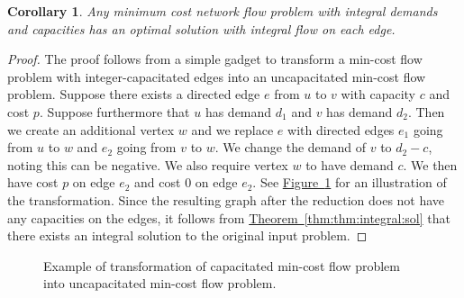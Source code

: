 \documentclass[10pt,a4paper]{amsart}
\newtheorem{corollary}[theorem]{Corollary}
\newcommand{\namedref}[2]{\hyperref[#2]{#1~\ref*{#2}}}
\newcommand{\thmref}[1]{\namedref{Theorem}{thm:#1}}
\newcommand{\corlab}[1]{\label{cor:#1}}
\newcommand{\figlab}[1]{\label{fig:#1}}
\newcommand{\figref}[1]{\namedref{Figure}{fig:#1}}
\begin{document}
\begin{corollary}
\corlab{cor:integral:sol}
Any minimum cost network flow problem with integral demands and capacities has an optimal solution with integral flow on each edge. 
\end{corollary}
\begin{proof}
The proof follows from a simple gadget to transform a min-cost flow problem with integer-capacitated edges into an uncapacitated min-cost flow problem. 
Suppose there exists a directed edge $e$ from $u$ to $v$ with capacity $c$ and cost $p$. 
Suppose furthermore that $u$ has demand $d_1$ and $v$ has demand $d_2$. 
Then we create an additional vertex $w$ and we replace $e$ with directed edges $e_1$ going from $u$ to $w$ and $e_2$ going from $v$ to $w$. 
We change the demand of $v$ to $d_2-c$, noting this can be negative. 
We also require vertex $w$ to have demand $c$. 
We then have cost $p$ on edge $e_2$ and cost $0$ on edge $e_2$. 
See \figref{fig:min:cost:transform} for an illustration of the transformation. 
Since the resulting graph after the reduction does not have any capacities on the edges, it follows from \thmref{thm:integral:sol} that there exists an integral solution to the original input problem. 
\end{proof}

\begin{figure}[!htb]
\centering
{}
\caption{Example of transformation of capacitated min-cost flow problem into uncapacitated min-cost flow problem.}
\figlab{fig:min:cost:transform}
\end{figure}
\end{document}
